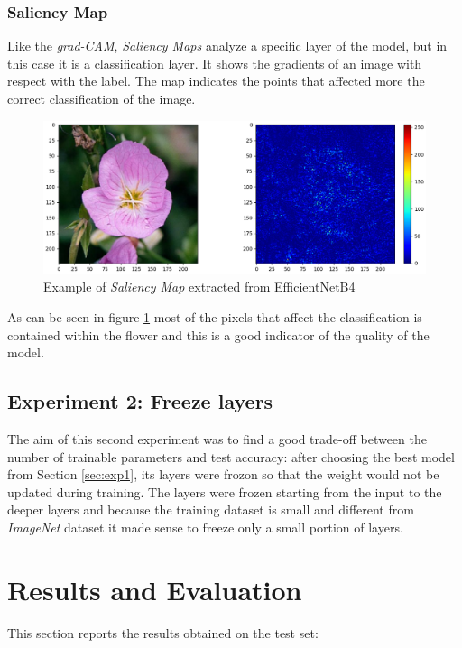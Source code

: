 \subsubsection{Saliency Map}
Like the \textit{grad-CAM}, \textit{Saliency Maps} analyze a specific layer of the model, but in this case it is a classification layer. It shows the gradients of
an image with respect with the label. The map indicates the points that affected more the correct classification of the image.
\begin{figure}[ht!]
\centering
\includegraphics[width=1\textwidth]{images/sal.png} 
\caption{Example of \textit{Saliency Map} extracted from EfficientNetB4}
\label{fig:sal}
\end{figure}

As can be seen in figure \ref{fig:sal} most of the pixels that affect the
classification is contained within the flower and this is a good indicator
of the quality of the model.







\subsection{Experiment 2: Freeze layers}\label{sec:exp2}
The aim of this second experiment was to find a good trade-off between the number of trainable parameters and test accuracy: after choosing the best model from Section \ref{sec:exp1}, its layers were frozon so that the weight would not be updated during training. The layers were frozen starting from the input to the deeper layers and because the training dataset is small and different from \textit{ImageNet} dataset it made sense to freeze only a small portion of layers.






\section{Results and Evaluation}
This section reports the results obtained on the test set:


